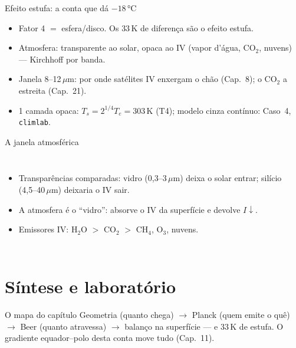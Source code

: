 \documentclass[aspectratio=169,11pt]{beamer}
\begin{document}
\begin{frame}{Efeito estufa: a conta que dá $-18\,°$C}
  \vspace{0.5em}
  \begin{itemize}
    \item Fator 4 $=$ esfera/disco. Os \alert{33\,K} de diferença são o
          efeito estufa.
    \item Atmosfera: transparente ao solar, opaca ao IV (vapor d'água,
          CO$_2$, nuvens) — Kirchhoff por banda.
    \item Janela 8--12\,$\mu$m: por onde satélites IV enxergam o chão
          (Cap.~8); o CO$_2$ a estreita (Cap.~21).
    \item 1 camada opaca: $T_s = 2^{1/4}T_e = 303$\,K (T4); modelo cinza
          contínuo: Caso~4, \texttt{climlab}.
  \end{itemize}
\end{frame}

\begin{frame}{A janela atmosférica}
  \begin{columns}
    \begin{itemize}
      \item Transparências comparadas: vidro (0{,}3--3\,$\mu$m) deixa o
            solar entrar; silício (4{,}5--40\,$\mu$m) deixaria o IV sair.
      \item A atmosfera é o ``vidro'': absorve o IV da superfície e
            devolve $I\!\downarrow$.
      \item Emissores IV: H$_2$O $>$ CO$_2$ $>$ CH$_4$, O$_3$, nuvens.
    \end{itemize}
  \end{columns}
\end{frame}

\section{Síntese e laboratório}

\begin{frame}{O mapa do capítulo}
  \vspace{0.6em}
  Geometria (quanto chega) $\to$ Planck (quem emite o quê) $\to$ Beer
  (quanto atravessa) $\to$ balanço na superfície — e 33\,K de estufa.
  O gradiente equador--polo desta conta move tudo (Cap.~11).
\end{frame}
\end{document}
